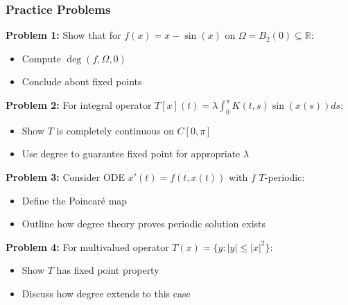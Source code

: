\documentclass[aspectratio=169,10pt]{beamer}
\begin{document}
\begin{frame}
\frametitle{Practice Problems}

\textbf{Problem 1:} Show that for $f(x) = x - \sin(x)$ on $\Omega = B_2(0) \subseteq \mathbb{R}$:
\begin{itemize}
    \item Compute $\deg(f, \Omega, 0)$
    \item Conclude about fixed points
\end{itemize}

\textbf{Problem 2:} For integral operator $T[x](t) = \lambda \int_0^\pi K(t,s) \sin(x(s)) ds$:
\begin{itemize}
    \item Show $T$ is completely continuous on $C[0,\pi]$
    \item Use degree to guarantee fixed point for appropriate $\lambda$
\end{itemize}

\textbf{Problem 3:} Consider ODE $x'(t) = f(t, x(t))$ with $f$ $T$-periodic:
\begin{itemize}
    \item Define the Poincaré map
    \item Outline how degree theory proves periodic solution exists
\end{itemize}

\textbf{Problem 4:} For multivalued operator $T(x) = \{y : |y| \leq |x|^2\}$:
\begin{itemize}
    \item Show $T$ has fixed point property
    \item Discuss how degree extends to this case
\end{itemize}
\end{frame}
\end{document}
